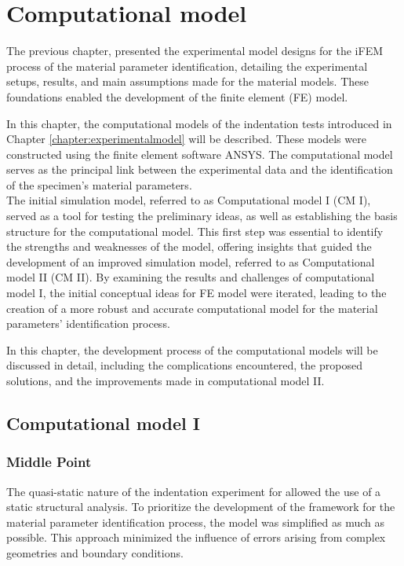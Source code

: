 
\chapter{Computational model} %
\label{chapter:computationalmodel} %

The previous chapter, presented the experimental model designs for the iFEM process of the material 
parameter identification, detailing the experimental setups, results, and main assumptions 
made for the material models. These foundations enabled the development of the finite element (FE) model.

In this chapter, the computational models of the indentation tests introduced in Chapter \ref{chapter:experimentalmodel} 
will be described. These models were constructed using the finite element software ANSYS. 
The computational model serves as the principal link between the experimental data and the identification of the 
specimen's material parameters.\\  

The initial simulation model, referred to as Computational model I (CM I), served as a tool 
for testing the preliminary ideas, as well as establishing the basis structure for 
the computational model. This first step was essential to identify the strengths and 
weaknesses of the model, offering insights that guided the development of an 
improved simulation model, referred to as Computational model II (CM II). By examining the 
results and challenges of computational model I, the initial conceptual ideas for FE model 
were iterated, leading to the creation of a more robust and accurate computational model
for the material parameters' identification process.

In this chapter, the development process of the computational models will be discussed in detail, 
including the complications encountered, the proposed solutions, 
and the improvements made in computational model II.

\section{Computational model I}
\label{section:cpI}
\subsection{Middle Point}
\label{subsection:mpcpI}
The quasi-static nature of the indentation experiment for allowed the use of a static 
structural analysis. To prioritize the development of the framework for the material 
parameter identification process, the model was simplified as much as possible.
This approach minimized the influence of errors arising from complex geometries and boundary conditions.

